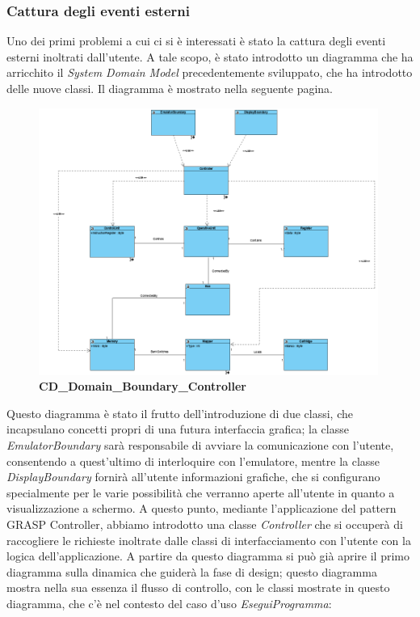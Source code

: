 \documentclass[11pt]{article}
\begin{document}
\subsubsection{Cattura degli eventi esterni}
Uno dei primi problemi a cui ci si è interessati è stato la cattura degli eventi esterni inoltrati dall'utente. A tale scopo, è stato introdotto un diagramma che ha arricchito il \emph{System Domain Model} precedentemente sviluppato, che ha introdotto delle nuove classi. Il diagramma è mostrato nella seguente pagina.\\
\begin{figure}[t]
\hspace*{-1cm}
\centering
\includegraphics[width=420px, height=330px]{CD_Domain_Boundary_Controller.png}\\
\small\textbf{CD\_Domain\_Boundary\_Controller}
\end{figure}
Questo diagramma è stato il frutto dell'introduzione di due classi, che incapsulano concetti propri di una futura interfaccia grafica; la classe \emph{EmulatorBoundary} sarà responsabile di avviare la comunicazione con l'utente, consentendo a quest'ultimo di interloquire con l'emulatore, mentre la classe \emph{DisplayBoundary} fornirà all'utente informazioni grafiche, che si configurano specialmente per le varie possibilità che verranno aperte all'utente in quanto a visualizzazione a schermo. A questo punto, mediante l'applicazione del pattern GRASP Controller, abbiamo introdotto una classe \emph{Controller} che si occuperà di raccogliere le richieste inoltrate dalle classi di interfacciamento con l'utente con la logica dell'applicazione.\clearpage
A partire da questo diagramma si può già aprire il primo diagramma sulla dinamica che guiderà la fase di design; questo diagramma mostra nella sua essenza il flusso di controllo, con le classi mostrate in questo diagramma, che c'è nel contesto del caso d'uso \emph{EseguiProgramma}:
\end{document}
